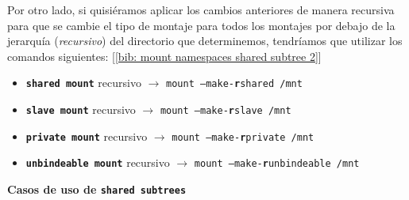 \documentclass[12pt]{article}
\begin{document}
	\noindent Por otro lado, si quisiéramos aplicar los cambios anteriores de manera recursiva para que se cambie el tipo de montaje para todos los montajes por debajo de la jerarquía (\textit{recursivo}) del directorio que determinemos, tendríamos que utilizar los comandos siguientes: [\ref{bib: mount namespaces shared subtree 2}]
	\begin{itemize}
		\item \textbf{\texttt{shared mount}} recursivo $\rightarrow$ \texttt{mount --make-\textbf{r}shared /mnt}
		\item \textbf{\texttt{slave mount}} recursivo $\rightarrow$ \texttt{mount --make-\textbf{r}slave /mnt}
		\item \textbf{\texttt{private mount}} recursivo $\rightarrow$ \texttt{mount --make-\textbf{r}private /mnt}
		\item \textbf{\texttt{unbindeable mount}} recursivo $\rightarrow$ \texttt{mount --make-\textbf{r}unbindeable /mnt}
	\end{itemize}

	\pagebreak
	
	\noindent \textbf{\large Casos de uso de \texttt{shared subtrees}}
	
\end{document}
